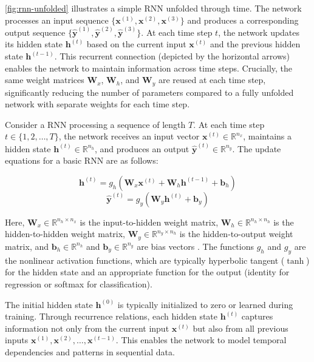 \autoref{fig:rnn-unfolded} illustrates a simple RNN unfolded through time. The network processes an input sequence \(\{\mathbf{x}^{(1)},\allowbreak \mathbf{x}^{(2)},\allowbreak \mathbf{x}^{(3)}\}\) and produces a corresponding output sequence \(\{\mathbf{\hat{y}}^{(1)}, \mathbf{\hat{y}}^{(2)}, \mathbf{\hat{y}}^{(3)}\}\). At each time step \(t\), the network updates its hidden state \(\mathbf{h}^{(t)}\) based on the current input \(\mathbf{x}^{(t)}\) and the previous hidden state \(\mathbf{h}^{(t-1)}\). This recurrent connection (depicted by the horizontal arrows) enables the network to maintain information across time steps. Crucially, the same weight matrices \(\mathbf{W}_x\), \(\mathbf{W}_h\), and \(\mathbf{W}_y\) are reused at each time step, significantly reducing the number of parameters compared to a fully unfolded network with separate weights for each time step.



Consider a RNN processing a sequence of length \(T\). At each time step \(t \in \{1, 2, \ldots, T\}\), the network receives an input vector \(\mathbf{x}^{(t)} \in \mathbb{R}^{n_x}\), maintains a hidden state \(\mathbf{h}^{(t)} \in \mathbb{R}^{n_h}\), and produces an output \(\mathbf{\hat{y}}^{(t)} \in \mathbb{R}^{n_y}\).
The update equations for a basic RNN are as follows:

\[
  \mathbf{h}^{(t)} = g_h(\mathbf{W}_x\mathbf{x}^{(t)} + \mathbf{W}_h\mathbf{h}^{(t-1)} + \mathbf{b}_h)
\]
\[
  \mathbf{\hat{y}}^{(t)} = g_y(\mathbf{W}_y\mathbf{h}^{(t)} + \mathbf{b}_y)
\]

Here, \(\mathbf{W}_x \in \mathbb{R}^{n_h \times n_x}\) is the input-to-hidden weight matrix, \(\mathbf{W}_h \in \mathbb{R}^{n_h \times n_h}\) is the hidden-to-hidden weight matrix, \(\mathbf{W}_y \in \mathbb{R}^{n_y \times n_h}\) is the hidden-to-output weight matrix, and \(\mathbf{b}_h \in \mathbb{R}^{n_h}\) and \(\mathbf{b}_y \in \mathbb{R}^{n_y}\) are bias vectors \parencite{goodfellow2016}. The functions \(g_h\) and \(g_y\) are the nonlinear activation functions, which are typically hyperbolic tangent (\(\tanh\)) for the hidden state and an appropriate function for the output (identity for regression or softmax for classification).

The initial hidden state \(\mathbf{h}^{(0)}\) is typically initialized to zero or learned during training. Through recurrence relations, each hidden state \(\mathbf{h}^{(t)}\) captures information not only from the current input \(\mathbf{x}^{(t)}\) but also from all previous inputs \(\mathbf{x}^{(1)}, \mathbf{x}^{(2)}, \ldots, \mathbf{x}^{(t-1)}\). This enables the network to model temporal dependencies and patterns in sequential data.

